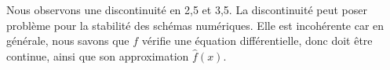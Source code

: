 Nous observons une discontinuité en 2,5 et 3,5. La discontinuité peut poser problème pour la stabilité des schémas numériques. Elle est incohérente car en générale, nous savons que \(f\) vérifie une équation différentielle, donc doit être continue, ainsi que son approximation \( \hat{f}(x) \).

